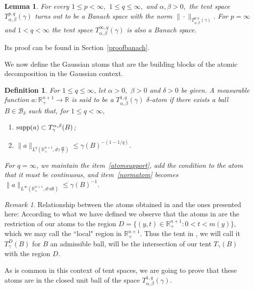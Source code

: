 \documentclass[leqno,11pt]{amsart}
\theoremstyle{plain}
\newtheorem{lemma}{Lemma}
\newtheorem{defi}{Definition}
\theoremstyle{remark}
\newtheorem{remark}{Remark}
\begin{document}
{\begin{lemma}\label{Bannach}
For every $1\le p<\infty,$ $1\le q\le \infty,$ and $\alpha,\beta>0,$ the tent space $T_{\alpha, \beta}^{p,q}(\gamma)$ turns out to be a Banach space with the norm $\|\cdot\|_{T_{\alpha, \beta}^{p,q}(\gamma)}.$
For $p=\infty$ and $1< q <\infty$ the tent space $T^{\infty, q}_{\alpha, \beta}(\gamma)$ is also a Banach space.
\end{lemma}
\noindent Its proof can be found in Section~\ref{proofbanach}.

We now define the Gaussian atoms that are the building blocks of the atomic decomposition in the Gaussian context.

\begin{defi}\label{ATOMOS}
For $1\le q\le \infty$, let $\alpha>0,$ $\beta>0$ and $\delta>0$ be given. A measurable function $a:\mathbb{R}^{n+1}_+\to \mathbb{R}$ is said to be a $T^{1,q}_{\alpha, \beta}(\gamma)$ $\delta$-atom if there exists a ball $B\in \mathscr{B}_{\delta}$ such that, for $1\le q<\infty,$
\begin{enumerate}
    \item \label{atomsupport}$\hbox{supp} (a)\subset T_\gamma^{\alpha, \beta} (B)$;
    \item \label{normatom}$\|a\|_{L^q\left(\mathbb{R}^{n+1}_+,d\gamma \, \frac{dt}{t}\right)}\leq \gamma(B)^{-(1-1/q)}$.  %
\end{enumerate}
For $q=\infty$, we maintain the item~\ref{atomsupport}, add the condition to the atom that it must be continuous, and item~\ref{normatom} becomes $\|a\|_{L^\infty(\mathbb{R}^{n+1}_+,d\gamma dt)}\le \gamma(B)^{-1}.$
\end{defi}


 
\begin{remark}
Relationship between the atoms obtained in \cite{MNP} and the ones presented here:
According to what we have defined we observe that the atoms in \cite{MNP} are the restriction of our atoms to the region $D=\{(y,t)\in \mathbb{R}^{n+1}_+: 0<t<m(y)\},$ which we may call the ``local" region in $\mathbb{R}_+^{n+1}.$ Thus the tent in \cite{MNP}, we will call it $T_\gamma^D(B)$ for $B$ an admissible ball, will be the intersection of our tent $T_\gamma(B)$ with the region $D.$
\end{remark}
 

As is common in this context of tent spaces, we are going to prove that these atoms are in the closed unit ball of the space $T^{1,q}_{\alpha, \beta}(\gamma).$

}
\end{document}
